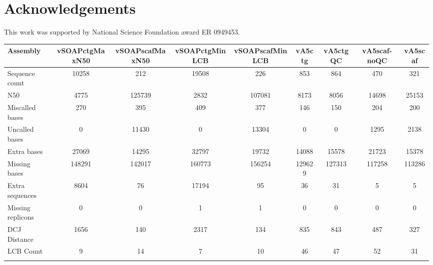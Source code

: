 \documentclass{bioinfo}
\begin{document}
\section*{Acknowledgements}
This work was supported by National Science Foundation award ER 0949453.






\begin{table}[!t] 
{\begin{tabular}{l|cccccccc}\toprule
Assembly           & vSOAPctgMaxN50 & vSOAPscafMaxN50 & vSOAPctgMinLCB & vSOAPscafMinLCB & vA5ctg & vA5ctgQC & vA5scaf-noQC & vA5scaf  \\\midrule
Sequence count     & 10258          & 212             & 19508          & 226             & 853       & 864         & 470          & 321         \\
N50                & 4775           & 125739          & 2832           & 107081          & 8173      & 8056        & 14698        & 25153       \\
Miscalled bases    & 270            & 395             & 409            & 377             & 146       & 150         & 204          & 200         \\
Uncalled bases     & 0              & 11430           & 0              & 13304           & 0         & 0           & 1295         & 2138        \\
Extra bases        & 27069          & 14295           & 32797          & 19732           & 14088     & 15578       & 21723        & 15378       \\
Missing bases      & 148291         & 142017          & 160773         & 156254          & 129629    & 127313      & 117258       & 113286      \\
Extra sequences    & 8604           & 76              & 17194          & 95              & 36        & 31          & 5            & 5           \\
Missing replicons  & 0              & 0               & 1              & 1               & 0         & 0           & 0            & 0           \\
DCJ Distance       & 1656           & 140             & 2317           & 134             & 835       & 843         & 487          & 327         \\
LCB Count          & 9              & 14              & 7              & 10              & 46        & 47          & 52           & 31          \\
\botrule \\
\end{tabular}}{}
\end{table}
\end{document}
